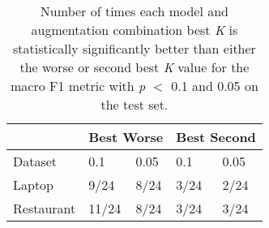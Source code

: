 \documentclass[11pt,a4paper]{article}
\begin{document}
\begin{table}[]
\begin{tabular}{|l|p{1cm}|p{1cm}|p{1cm}|p{1cm}|}
\hline
 &  \multicolumn{2}{l|}{Best Worse} & \multicolumn{2}{l|}{Best Second}  \\ 
\hline
Dataset &  0.1 & 0.05 & 0.1 & 0.05 \\ \hline
Laptop & 9/24 & 8/24 & 3/24 & 2/24 \\ \hline
Restaurant & 11/24 & 8/24 & 3/24 & 3/24 \\ \hline
\end{tabular}
\caption{Number of times each model and augmentation combination best \textit{K} is statistically significantly better than either the worse or second best \textit{K} value for the macro F1 metric with \textit{p} $<$ 0.1 and 0.05 on the test set.}
\end{table}
\end{document}
